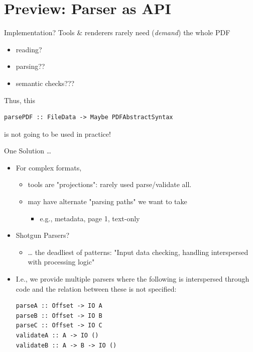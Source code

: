 \documentclass[t,10pt,xcolor={dvipsnames}]{beamer}
\begin{document}
\section{Preview: Parser as API}
\label{sec:org740d0d9}
\begin{frame}[label={sec:org5b65951},fragile]{Implementation?}
 Tools \& renderers rarely need (\emph{demand}) the whole PDF
\begin{itemize}
\item reading?
\item parsing??
\item semantic checks???
\end{itemize}
\vspace{12pt}

Thus, this
\lstset{language=haskell,label= ,caption= ,captionpos=b,numbers=none}
\begin{lstlisting}
parsePDF :: FileData -> Maybe PDFAbstractSyntax
\end{lstlisting}
is not going to be used in practice!     
\end{frame}

\begin{frame}[label={sec:org998e8f0},fragile]{One Solution \ldots{}}
 \begin{itemize}
\item For complex formats,
\begin{itemize}
\item tools are "projections": rarely used parse/validate all.
\item may have alternate "parsing paths" we want to take
\begin{itemize}
\item e.g., metadata, page 1, text-only
\end{itemize}
\end{itemize}

\item Shotgun Parsers?
\begin{itemize}
\item \ldots{} the deadliest of patterns: "Input data checking, handling interspersed
with processing logic"
\end{itemize}

\item I.e., we provide multiple parsers where the following is interspersed through
code and the relation between these is \alert{not specified}:
\lstset{language=haskell,label= ,caption= ,captionpos=b,numbers=none}
\begin{lstlisting}
parseA :: Offset -> IO A
parseB :: Offset -> IO B
parseC :: Offset -> IO C
validateA :: A -> IO ()
validateB :: A -> B -> IO ()
\end{lstlisting}
\end{itemize}
\end{frame}
\end{document}
